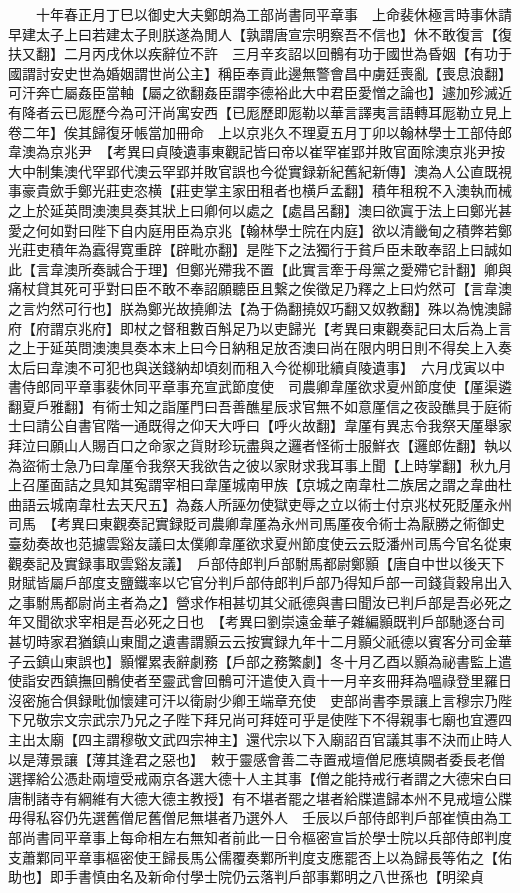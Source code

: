 　　十年春正月丁巳以御史大夫鄭朗為工部尚書同平章事　上命裴休極言時事休請早建太子上曰若建太子則朕遂為閒人【孰謂唐宣宗明察吾不信也】休不敢復言【復扶又翻】二月丙戌休以疾辭位不許　三月辛亥詔以回鶻有功于國世為昏姻【有功于國謂討安史世為婚姻謂世尚公主】稱臣奉貢此邊無警會昌中虜廷喪亂【喪息浪翻】可汗奔亡屬姦臣當軸【屬之欲翻姦臣謂李德裕此大中君臣愛憎之論也】遽加殄滅近有降者云已厖歷今為可汗尚寓安西【已厖歷即厖勒以華言譯夷言語轉耳厖勒立見上卷二年】俟其歸復牙帳當加冊命　上以京兆久不理夏五月丁卯以翰林學士工部侍郎韋澳為京兆尹　【考異曰貞陵遺事東觀記皆曰帝以崔罕崔郢并敗官面除澳京兆尹按大中制集澳代罕郢代澳云罕郢并敗官誤也今從實録新紀舊紀新傳】澳為人公直既視事豪貴歛手鄭光莊吏恣横【莊吏掌主家田租者也横戶孟翻】積年租稅不入澳執而械之上於延英問澳澳具奏其狀上曰卿何以處之【處昌呂翻】澳曰欲寘于法上曰鄭光甚愛之何如對曰陛下自内庭用臣為京兆【翰林學士院在内庭】欲以清畿甸之積弊若鄭光莊吏積年為蠧得寛重辟【辟毗亦翻】是陛下之法獨行于貧戶臣未敢奉詔上曰誠如此【言韋澳所奏誠合于理】但鄭光殢我不置【此實言牽于母黨之愛殢它計翻】卿與痛杖貸其死可乎對曰臣不敢不奉詔願聽臣且繋之俟徵足乃釋之上曰灼然可【言韋澳之言灼然可行也】朕為鄭光故撓卿法【為于偽翻撓奴巧翻又奴教翻】殊以為愧澳歸府【府謂京兆府】即杖之督租數百斛足乃以吏歸光【考異曰東觀奏記曰太后為上言之上于延英問澳澳具奏本末上曰今日納租足放否澳曰尚在限内明日則不得矣上入奏太后曰韋澳不可犯也與送錢納却頃刻而租入今從柳玭續貞陵遺事】　六月戊寅以中書侍郎同平章事裴休同平章事充宣武節度使　司農卿韋厪欲求夏州節度使【厪渠遴翻夏戶雅翻】有術士知之詣厪門曰吾善醮星辰求官無不如意厪信之夜設醮具于庭術士曰請公自書官階一通既得之仰天大呼曰【呼火故翻】韋厪有異志令我祭天厪舉家拜泣曰願山人賜百口之命家之貨財珍玩盡與之邏者怪術士服鮮衣【邏郎佐翻】執以為盜術士急乃曰韋厪令我祭天我欲告之彼以家財求我耳事上聞【上時掌翻】秋九月上召厪面詰之具知其寃謂宰相曰韋厪城南甲族【京城之南韋杜二族居之謂之韋曲杜曲語云城南韋杜去天尺五】為姦人所誣勿使獄吏辱之立以術士付京兆杖死貶厪永州司馬　【考異曰東觀奏記實録貶司農卿韋厪為永州司馬厪夜令術士為厭勝之術御史臺劾奏故也范攄雲谿友議曰太僕卿韋厪欲求夏州節度使云云貶潘州司馬今官名從東觀奏記及實録事取雲谿友議】　戶部侍郎判戶部駙馬都尉鄭顥【唐自中世以後天下財賦皆屬戶部度支鹽鐵率以它官分判戶部侍郎判戶部乃得知戶部一司錢貨穀帛出入之事駙馬都尉尚主者為之】營求作相甚切其父祇德與書曰聞汝已判戶部是吾必死之年又聞欲求宰相是吾必死之日也　【考異曰劉崇遠金華子雜編顥既判戶部馳逐台司甚切時家君猶鎮山東聞之遺書謂顥云云按實録九年十二月顥父祇德以賓客分司金華子云鎮山東誤也】顥懼累表辭劇務【戶部之務繁劇】冬十月乙酉以顥為祕書監上遣使詣安西鎮撫回鶻使者至靈武會回鶻可汗遣使入貢十一月辛亥冊拜為嗢祿登里羅日沒密施合俱録毗伽懷建可汗以衛尉少卿王端章充使　吏部尚書李景讓上言穆宗乃陛下兄敬宗文宗武宗乃兄之子陛下拜兄尚可拜姪可乎是使陛下不得親事七廟也宜遷四主出太廟【四主謂穆敬文武四宗神主】還代宗以下入廟詔百官議其事不決而止時人以是薄景讓【薄其逢君之惡也】　敕于靈感會善二寺置戒壇僧尼應填闕者委長老僧選擇給公憑赴兩壇受戒兩京各選大德十人主其事【僧之能持戒行者謂之大德宋白曰唐制諸寺有綱維有大德大德主教授】有不堪者罷之堪者給牒遣歸本州不見戒壇公牒毋得私容仍先選舊僧尼舊僧尼無堪者乃選外人　壬辰以戶部侍郎判戶部崔慎由為工部尚書同平章事上每命相左右無知者前此一日令樞密宣旨於學士院以兵部侍郎判度支蕭鄴同平章事樞密使王歸長馬公儒覆奏鄴所判度支應罷否上以為歸長等佑之【佑助也】即手書慎由名及新命付學士院仍云落判戶部事鄴明之八世孫也【明梁貞
